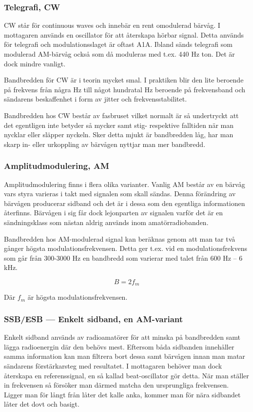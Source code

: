 \subsubsection{Telegrafi, CW}

CW står för continuous waves och innebär en rent omodulerad bärvåg. I mottagaren används en oscillator för att återskapa hörbar signal. Detta används för telegrafi och modulationsslaget är oftast A1A. Ibland sänds telegrafi som modulerad AM-bärvåg också som då moduleras med t.ex. 440 Hz ton. Det är dock mindre vanligt. 

Bandbredden för CW är i teorin mycket smal. I praktiken blir den lite beroende på frekvens från några Hz till något hundratal Hz beroende på frekvensband och sändarens beskaffenhet i form av jitter och frekvensstabilitet.

Bandbredden hos CW består av fasbruset vilket normalt är så undertryckt att det egentligen inte betyder så mycker samt stig- respektive falltiden när man nycklar eller släpper nyckeln. Sker detta mjukt är bandbredden låg, har man skarp in- eller urkoppling av bärvågen nyttjar man mer bandbredd.

\subsubsection{Amplitudmodulering, AM}

Amplitudmodulering finns i flera olika varianter. Vanlig AM består av en bärvåg vars styra varieras i takt med signalen som skall sändas. Denna förändring av bärvågen producerar sidband och det är i dessa som den egentliga informationen återfinns. Bärvågen i sig får dock lejonparten av signalen varför det är en sändningsklass som nästan aldrig används inom amatörradiobanden.

Bandbredden hos AM-modulerad signal kan beräknas genom att man tar två gånger högsta modulationsfrekvensen. Detta ger t.ex. vid en modulationsfrekvens som går från 300-3000 Hz en bandbredd som varierar med talet från 600 Hz -- 6 kHz.

$$B=2f_m$$

Där $f_m$ är högsta modulationsfrekvensen.

\subsubsection{SSB/ESB --- Enkelt sidband, en AM-variant}

Enkelt sidband används av radioamatörer för att minska på bandbredden samt lägga radioenergin där den behövs mest. Eftersom båda sidbanden innehåller samma information kan man filtrera bort dessa samt bärvågen innan man matar sändarens förstärkarsteg med resultatet. I mottagaren behöver man dock återskapa en referenssignal, en så kallad beat-oscillator gör detta. När man ställer in frekvensen så försöker man därmed matcha den ursprungliga frekvensen. Ligger man för långt från låter det kalle anka, kommer man för nära sidbandet låter det dovt och basigt. 

